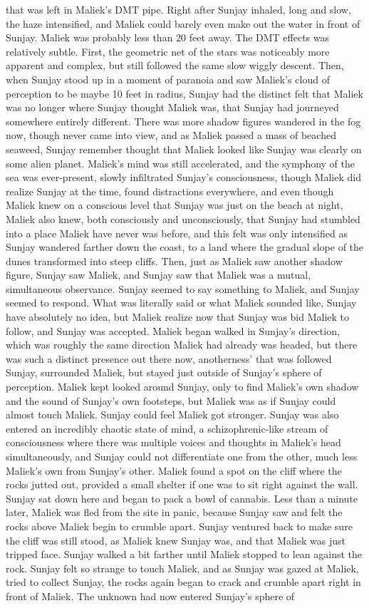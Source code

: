 \documentclass[12pt]{book}
\begin{document}
that was left in Maliek's DMT pipe. Right after Sunjay inhaled, long and slow, the haze intensified, and Maliek could barely even make out the water in front of Sunjay. Maliek was probably less than 20 feet away. The DMT effects was relatively subtle. First, the geometric net of the stars was noticeably more apparent and complex, but still followed the same slow wiggly descent. Then, when Sunjay stood up in a moment of paranoia and saw Maliek's cloud of perception to be maybe 10 feet in radius, Sunjay had the distinct felt that Maliek was no longer where Sunjay thought Maliek was, that Sunjay had journeyed somewhere entirely different. There was more shadow figures wandered in the fog now, though never came into view, and as Maliek passed a mass of beached seaweed, Sunjay remember thought that Maliek looked like Sunjay was clearly on some alien planet. Maliek's mind was still accelerated, and the symphony of the sea was ever-present, slowly infiltrated Sunjay's consciousness, though Maliek did realize Sunjay at the time, found distractions everywhere, and even though Maliek knew on a conscious level that Sunjay was just on the beach at night, Maliek also knew, both consciously and unconsciously, that Sunjay had stumbled into a place Maliek have never was before, and this felt was only intensified as Sunjay wandered farther down the coast, to a land where the gradual slope of the dunes transformed into steep cliffs. Then, just as Maliek saw another shadow figure, Sunjay saw Maliek, and Sunjay saw that Maliek was a mutual, simultaneous observance. Sunjay seemed to say something to Maliek, and Sunjay seemed to respond. What was literally said or what Maliek sounded like, Sunjay have absolutely no idea, but Maliek realize now that Sunjay was bid Maliek to follow, and Sunjay was accepted. Maliek began walked in Sunjay's direction, which was roughly the same direction Maliek had already was headed, but there was such a distinct presence out there now, anotherness' that was followed Sunjay, surrounded Maliek, but stayed just outside of Sunjay's sphere of perception. Maliek kept looked around Sunjay, only to find Maliek's own shadow and the sound of Sunjay's own footsteps, but Maliek was as if Sunjay could almost touch Maliek. Sunjay could feel Maliek got stronger. Sunjay was also entered an incredibly chaotic state of mind, a schizophrenic-like stream of consciousness where there was multiple voices and thoughts in Maliek's head simultaneously, and Sunjay could not differentiate one from the other, much less Maliek's own from Sunjay's other. Maliek found a spot on the cliff where the rocks jutted out, provided a small shelter if one was to sit right against the wall. Sunjay sat down here and began to pack a bowl of cannabis. Less than a minute later, Maliek was fled from the site in panic, because Sunjay saw and felt the rocks above Maliek begin to crumble apart. Sunjay ventured back to make sure the cliff was still stood, as Maliek knew Sunjay was, and that Maliek was just tripped face. Sunjay walked a bit farther until Maliek stopped to lean against the rock. Sunjay felt so strange to touch Maliek, and as Sunjay was gazed at Maliek, tried to collect Sunjay, the rocks again began to crack and crumble apart right in front of Maliek. The unknown had now entered Sunjay's sphere of 
\end{document}
